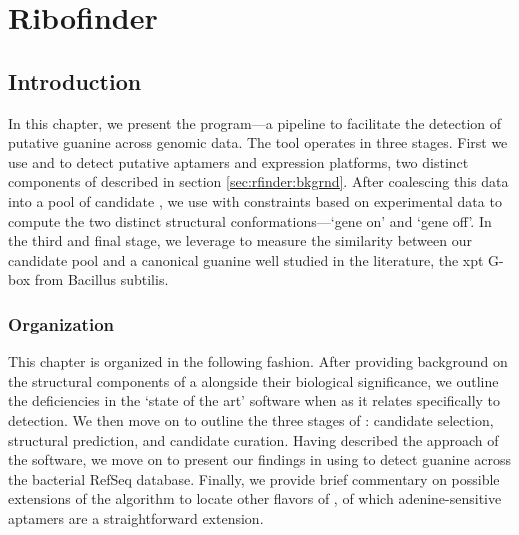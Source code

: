 
\newcommand{\fnaRetrievalTime}{\formatdate{25}{11}{2014} at \formattime{9}{14}{0}}
\newcommand{\tree}{{\mathcal T}\xspace}
\newcommand{\treeFor}[1]{\ensuremath{{\mathcal T}_{\text #1}}}
\newcommand{\textdown}[2]{\ensuremath{{\text{#1}}_{\text{#2}}}}
\newcommand{\treePos}[2]{\textdown{\ms{#1}}{#2}}
\newcommand{\treeIdx}[3]{\treePos{#1}{#2}\ensuremath{(#3)}}

\newcommand{\strConst}[1]{\ensuremath{{\mathcal C}_{\text{#1}}}\xspace}
\newcommand{\strOff}{\ensuremath{{\mathcal S}_{\text{off}}}\xspace}
\newcommand{\strOn}{\ensuremath{{\mathcal S}_{\text{on}}}\xspace}

\newcommand{\rshapes}{\ms{RNAshapes}}

\chapter{Ribofinder}
\label{ch:rfinder}


\section{Introduction}
\label{sec:rfinder:intro}

In this chapter, we present the \rfinder program---a pipeline to facilitate the
detection of putative guanine \rbs across genomic data. The \rfinder
tool operates in three stages. First we use \infernal and \tthp to detect
putative aptamers and expression platforms, two distinct components of
\rbs described in section \ref{sec:rfinder:bkgrnd}. After coalescing
this data into a pool of candidate \rbs, we use \rfold with constraints
based on experimental data to compute the two distinct structural
conformations---`gene on' and `gene off'. In the third and final stage, we
leverage \foldalign to measure the similarity between our candidate pool and a
canonical guanine \rb well studied in the literature, the xpt G-box
\rb from Bacillus subtilis.

\subsection{Organization}
\label{subsec:rfinder:org}

This chapter is organized in the following fashion. After providing background
on the structural components of a \rb alongside their biological
significance, we outline the deficiencies in the `state of the art' software
when as it relates specifically to \rb detection. We then move on to outline
the three stages of \rfinder: candidate selection, structural prediction, and
candidate curation. Having described the approach of the software, we move on
to present our findings in using \rfinder to detect guanine \rbs across
the bacterial RefSeq database. Finally, we provide brief commentary on possible
extensions of the algorithm to locate other flavors of \rbs, of which
adenine-sensitive aptamers are a straightforward extension.

